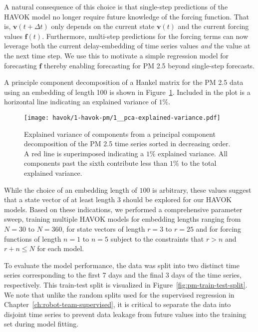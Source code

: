 A natural consequence of this choice is that single-step predictions of the
HAVOK model no longer require future knowledge of the forcing function. That is,
$\mathbf{v}(t+\Delta t)$ only depends on the current state $\mathbf{v}(t)$ and
the current forcing values $\mathbf{f}(t)$. Furthermore, multi-step
predictions for the forcing terms can now leverage both the current delay-embedding of
time series values \textit{and} the value at the next time step. We use this to
motivate a simple regression model for forecasting $\mathbf{f}$ thereby enabling
forecasting for PM 2.5 beyond single-step forecasts.

A principle component decomposition of a Hankel matrix for the PM 2.5 data 
using an embedding of length 100 is shown in Figure~\ref{fig:pm-timeseries-pca}.
Included in the plot is a horizontal line indicating an explained variance of
$1\%$.

\begin{figure}[h]
  \centering
  \texttt{[image: havok/1-havok-pm/1\_\_pca-explained-variance.pdf]}
  \caption{Explained variance of components from a principal component
    decomposition of the PM 2.5 time series sorted in decreasing order. A red
    line is superimposed indicating a $1\%$ explained variance. All components
    past the sixth contribute less than $1\%$ to the total explained variance. }
  \label{fig:pm-timeseries-pca}
\end{figure}

While the choice of an embedding length of $100$ is arbitrary, these values
suggest that a state vector of at least length $3$ should be explored for our HAVOK
models. Based on these indications, we performed a comprehensive parameter sweep,
training multiple HAVOK models for embedding lengths ranging from $N=30$ to
$N=360$, for state vectors of length $r=3$ to $r=25$ and for forcing functions
of length $n=1$ to $n=5$ subject to the constraints that $r>n$ and $r+n \leq N$
for each model.

To evaluate the model performance, the data was split into two distinct time
series corresponding to the first 7 days and the final 3 days of the time
series, respectively. This train-test split is visualized in
Figure~\ref{fig:pm-train-test-split}. We note that unlike the random splits used
for the supervised regression in Chapter~\ref{ch:robot-team-supervised}, it is
critical to separate the data into  disjoint time series to prevent data leakage
from future values into the training set during model fitting.


